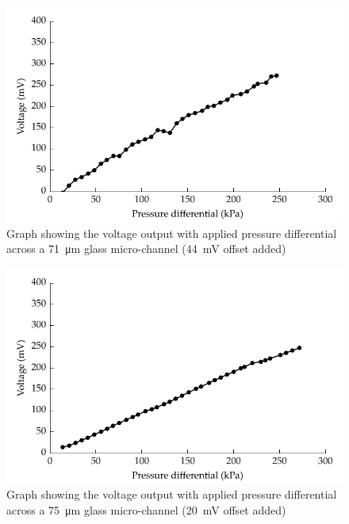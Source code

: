 \begin{figure}
    \centering
    \includegraphics{content/pt1/01-PowerHarvesting/graphics/streamingCell_voltVsPress_71um_out}
    \caption{\label{fig:VvsP_71um}Graph showing the voltage output with applied pressure differential across a \SI{71}{\micro\metre} glass micro-channel (\SI{44}{\milli\volt} offset added)}
\end{figure}

\begin{figure}
    \centering
    \includegraphics{content/pt1/01-PowerHarvesting/graphics/streamingCell_voltVsPress_75um_out}
    \caption{\label{fig:VvsP_75um}Graph showing the voltage output with applied pressure differential across a \SI{75}{\micro\metre} glass micro-channel (\SI{20}{\milli\volt} offset added)}
\end{figure}

